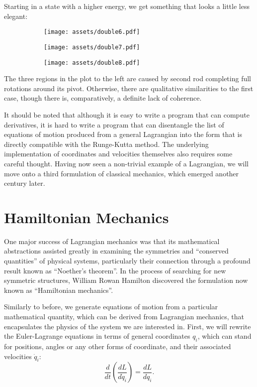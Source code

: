 \documentclass[11pt]{article}
\begin{document}
Starting in a state with a higher energy, we get something that looks a little less elegant:

\begin{figure}[htbp]
\centering
\begin{subfigure}{110pt}
\texttt{[image: assets/double6.pdf]}
\end{subfigure}
\begin{subfigure}{110pt}
\texttt{[image: assets/double7.pdf]}
\end{subfigure}
\begin{subfigure}{110pt}
\texttt{[image: assets/double8.pdf]}
\end{subfigure}
\label{plot:double6}
\end{figure}

The three regions in the plot to the left are caused by second rod completing full rotations around its pivot. Otherwise, there are qualitative similarities to the first case, though there is, comparatively, a definite lack of coherence.
\newline

It should be noted that although it is easy to write a program that can compute derivatives, it is hard to write a program that can disentangle the list of equations of motion produced from a general Lagrangian into the form that is directly compatible with the Runge\hyp{}Kutta method. The underlying implementation of coordinates and velocities themselves also requires some careful thought. Having now seen a non\hyp{}trivial example of a Lagrangian, we will move onto a third formulation of classical mechanics, which emerged another century later.

\section{Hamiltonian Mechanics}

One major success of Lagrangian mechanics was that its mathematical abstractions assisted greatly in examining the symmetries and ``conserved quantities'' of physical systems, particularly their connection through a profound result known as ``Noether's theorem''. In the process of searching for new symmetric structures, William Rowan Hamilton discovered the formulation now known as ``Hamiltonian mechanics''.
\newpage

Similarly to before, we generate equations of motion from a particular mathematical quantity, which can be derived from Lagrangian mechanics, that encapsulates the physics of the system we are interested in. First, we will rewrite the Euler\hyp{}Lagrange equations in terms of general coordinates $q_i$, which can stand for positions, angles or any other forms of coordinate, and their associated velocities $\dot{q}_i$:
$$\frac{d}{dt}\left(\frac{dL}{d\dot{q}_i}\right)=\frac{dL}{dq_i}.$$
\end{document}
